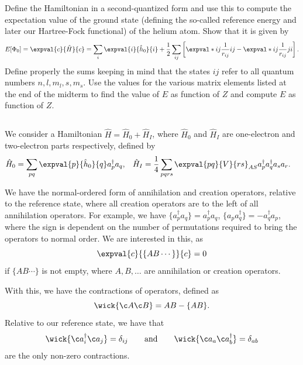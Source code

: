 Define the Hamiltonian in a second-quantized form and use this to compute the expectation value of the ground state (defining the so-called reference energy and later our Hartree-Fock functional) of
the helium atom.
Show that it is given by
\begin{equation}
    E[\Phi_0] = \expval{c}{\hat{H}}{c} = \sum_{i} \expval{i}{\hat{h}_0}{i} + \frac{1}{2} \sum_{ij} \left[\expval*{ij}{\frac{1}{r_{ij}}}{ij} - \expval*{ij}{\frac{1}{r_{ij}}}{ji}\right].
\end{equation}
Define properly the sums keeping in mind that the states $ij$ refer to all quantum numbers $n, l, m_l, s, m_s$.
Use the values for the various matrix elements listed at the end of the midterm to find the value of $E$ as function of $Z$ and compute $E$ as function of $Z$.

\subsection{}
We consider a Hamiltonian $\hat{H} = \hat{H}_0 + \hat{H}_I$, where $\hat{H}_0$ and $\hat{H}_I$ are one-electron and two-electron parts respectively, defined by
\begin{align}
    \hat{H}_0 &= \sum_{p q} \expval{p}{\hat{h}_0}{q} a_p^\dagger a_q, &
    \hat{H}_I &= \frac{1}{4} \sum_{pqrs} \expval{pq}{V}{rs}_{AS} a_p^\dagger a_q^\dagger a_s a_r.
\end{align}

We have the normal-ordered form of annihilation and creation operators, relative to the reference state, where all creation operators are to the left of all annihilation operators.
For example, we have $\{a_p^\dagger a_q \} = a_p^\dagger a_q$, $\{ a_p a_q^\dagger \} = -a_q^\dagger a_p$, where the sign is dependent on the number of permutations required to bring the operators to normal order.
We are interested in this, as
\begin{equation*}
    \expval{c}{\{ A B\dotsm \}}{c} = 0
\end{equation*}
if $\{ A B \dotsm\}$ is not empty, where $A, B, \dotsc$ are annihilation or creation operators.

With this, we have the contractions of operators, defined as
\begin{equation*}
    \wick{\c A \c B} = AB - \{AB\}.
\end{equation*}
Relative to our reference state, we have that
\begin{equation*}
    \wick{\c a_i^\dagger \c a_j} = \delta_{i j} \qquad \text{and} \qquad
    \wick{\c a_a \c a_b^\dagger} = \delta_{a b}
\end{equation*}
are the only non-zero contractions.


